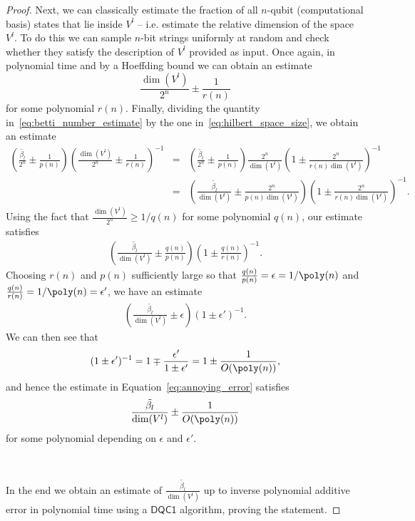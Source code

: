 \documentclass[11pt]{article}
\numberwithin{equation}{section}
\newcommand{\DQC}{\mathsf{DQC1}}
\renewcommand\( {\left(}
\renewcommand\) {\right)}
\begin{document}
\begin{proof}
Next, we can classically estimate the fraction of all $n$-qubit (computational basis) states that lie inside $V^l$ -- i.e. estimate the relative dimension of the space $V^l$. To do this we can sample $n$-bit strings uniformly at random and check whether they satisfy the description of $V^l$ provided as input. Once again, in polynomial time and by a Hoeffding bound we can obtain an estimate
\begin{equation}\label{eq:hilbert_space_size}
	\frac{\dim(V^l)}{2^n} \pm \frac{1}{r(n)}
\end{equation}
for some polynomial $r(n)$. Finally, dividing the quantity in~\ref{eq:betti_number_estimate} by the one in~\ref{eq:hilbert_space_size}, we obtain an estimate
\begin{eqnarray}
	\left( \frac{\tilde{\beta_l}}{2^n} \pm \frac{1}{p(n)} \right) \left( \frac{\dim(V^l)}{2^n} \pm \frac{1}{r(n)} \right)^{-1} 
	&=& \left( \frac{\tilde{\beta_l}}{2^n} \pm \frac{1}{p(n)} \right) \frac{2^n}{\dim(V^l)} \left( 1 \pm \frac{2^n}{r(n)\dim(V^l)} \right)^{-1} \\
	&=& \left( \frac{\tilde{\beta_l}}{\dim(V^l)} \pm \frac{2^n}{p(n)\dim(V^l)} \right) \left( 1 \pm \frac{2^n}{r(n)\dim(V^l)} \right)^{-1}. \nonumber
\end{eqnarray}
Using the fact that $\frac{\dim(V^l)}{2^n} \geq 1/q(n)$ for some polynomial $q(n)$, our estimate satisfies
\begin{eqnarray}
	 \left( \frac{\tilde{\beta_l}}{\dim(V^l)} \pm \frac{q(n)}{p(n)} \right) \left( 1 \pm \frac{q(n)}{r(n)} \right)^{-1}.
\end{eqnarray}
Choosing $r(n)$ and $p(n)$ sufficiently large so that $\frac{q(n)}{p(n)} = \epsilon = 1/\poly(n)$ and $\frac{q(n)}{r(n)} = 1/\poly(n) = \epsilon'$, we have an estimate 
\begin{eqnarray}\label{eq:annoying_error}
	 \left( \frac{\tilde{\beta_l}}{\dim(V^l)} \pm \epsilon \right) \left( 1 \pm \epsilon' \right)^{-1}.
\end{eqnarray}
We can then see that
\[
	(1 \pm \epsilon')^{-1} = 1 \mp \frac{\epsilon'}{1 \pm \epsilon'} = 1 \pm \frac{1}{O(\poly(n))},
\]
and hence the estimate in Equation~\ref{eq:annoying_error} satisfies
\begin{eqnarray}
	 \frac{\tilde{\beta_l}}{\dim(V^l)} \pm \frac{1}{O(\poly(n))}
\end{eqnarray}
for some polynomial depending on $\epsilon$ and $\epsilon'$. 

\

In the end we obtain an estimate of $\frac{\tilde{\beta_l}}{\dim(V^l)}$ up to inverse polynomial additive error in polynomial time using a $\DQC$ algorithm, proving the statement.
\end{proof}
\end{document}
